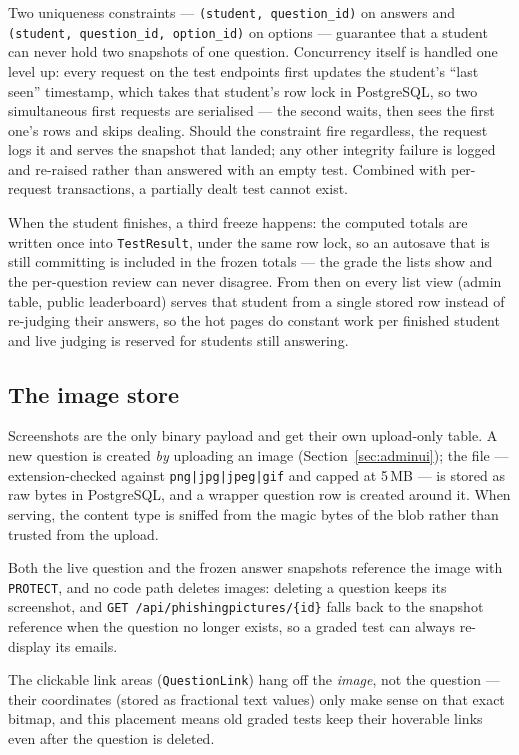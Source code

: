 \documentclass[11pt,a4paper]{article}
\newcommand{\code}[1]{\texttt{#1}}
\begin{document}
Two uniqueness constraints ---
\code{(student, question\_id)} on answers and
\code{(student, question\_id, option\_id)} on options --- guarantee
that a student can never hold two snapshots of one question.
Concurrency itself is handled one level up: every request on the test
endpoints first updates the student's ``last seen'' timestamp, which
takes that student's row lock in PostgreSQL, so two simultaneous first
requests are serialised --- the second waits, then sees the first one's
rows and skips dealing. Should the constraint fire regardless, the
request logs it and serves the snapshot that landed; any other
integrity failure is logged and re-raised rather than answered with an
empty test. Combined with per-request transactions, a partially dealt
test cannot exist.

When the student finishes, a third freeze happens: the computed totals
are written once into \code{TestResult}, under the same row lock, so
an autosave that is still committing is included in the frozen totals
--- the grade the lists show and the per-question review can never
disagree. From then on every list view (admin table, public
leaderboard) serves that student from a single stored row instead of
re-judging their answers, so the hot pages do constant work per
finished student and live judging is reserved for students still
answering.

\subsection{The image store}

Screenshots are the only binary payload and get their own upload-only
table. A new question is created \emph{by} uploading an image
(Section~\ref{sec:adminui}); the file --- extension-checked against
\code{png|jpg|jpeg|gif} and capped at 5\,MB --- is stored as raw bytes
in PostgreSQL, and a wrapper question row is created around it. When
serving, the content type is sniffed from the magic bytes of the blob
rather than trusted from the upload.

Both the live question and the frozen answer snapshots reference the
image with \code{PROTECT}, and no code path deletes images: deleting a
question keeps its screenshot, and
\code{GET /api/phishingpictures/\{id\}} falls back to the snapshot
reference when the question no longer exists, so a graded test can
always re-display its emails.

The clickable link areas (\code{QuestionLink}) hang off the
\emph{image}, not the question --- their coordinates (stored as
fractional text values) only make sense on that exact bitmap, and this
placement means old graded tests keep their hoverable links even after
the question is deleted.
\end{document}
